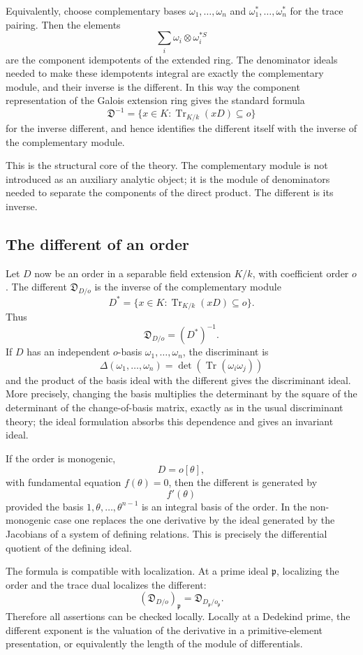 \documentclass[11pt]{article}
\begin{document}
Equivalently, choose complementary bases \(\omega_1,
\ldots,
\omega_n\) and \(\omega_1^*,
\ldots,\omega_n^*\) for the trace pairing. Then the elements
\[
  \sum_i \omega_i\otimes \omega_i^{*S}
\]
are the component idempotents of the extended ring. The denominator ideals needed to make these idempotents integral are exactly the complementary module, and their inverse is the different. In this way the component representation of the Galois extension ring gives the standard formula
\[
  \mathfrak D^{-1}=\{x\in K: \operatorname{Tr}_{K/k}(xD)\subseteq o\}
\]
for the inverse different, and hence identifies the different itself with the inverse of the complementary module.

This is the structural core of the theory. The complementary module is not introduced as an auxiliary analytic object; it is the module of denominators needed to separate the components of the direct product. The different is its inverse.

\subsection{The different of an order}

Let \(D\) now be an order in a separable field extension \(K/k\), with coefficient order \(o\). The different \(\mathfrak D_{D/o}\) is the inverse of the complementary module
\[
  D^*=
  \{x\in K: \operatorname{Tr}_{K/k}(xD)\subseteq o\}.
\]
Thus
\[
  \mathfrak D_{D/o}=(D^*)^{-1}.
\]
If \(D\) has an independent \(o\)-basis \(\omega_1,
\ldots,
\omega_n\), the discriminant is
\[
  \Delta(\omega_1,
\ldots,
\omega_n)=
  \det(\operatorname{Tr}(\omega_i\omega_j))
\]
and the product of the basis ideal with the different gives the discriminant ideal. More precisely, changing the basis multiplies the determinant by the square of the determinant of the change-of-basis matrix, exactly as in the usual discriminant theory; the ideal formulation absorbs this dependence and gives an invariant ideal.

If the order is monogenic,
\[
  D=o[\theta],
\]
with fundamental equation \(f(\theta)=0\), then the different is generated by
\[
  f'(\theta)
\]
provided the basis \(1,\theta,
\ldots,
\theta^{n-1}\) is an integral basis of the order. In the non-monogenic case one replaces the one derivative by the ideal generated by the Jacobians of a system of defining relations. This is precisely the differential quotient of the defining ideal.

The formula is compatible with localization. At a prime ideal \(\mathfrak p\), localizing the order and the trace dual localizes the different:
\[
  (\mathfrak D_{D/o})_{\mathfrak p}
  =\mathfrak D_{D_{\mathfrak p}/o_{\mathfrak p}}.
\]
Therefore all assertions can be checked locally. Locally at a Dedekind prime, the different exponent is the valuation of the derivative in a primitive-element presentation, or equivalently the length of the module of differentials.
\end{document}
